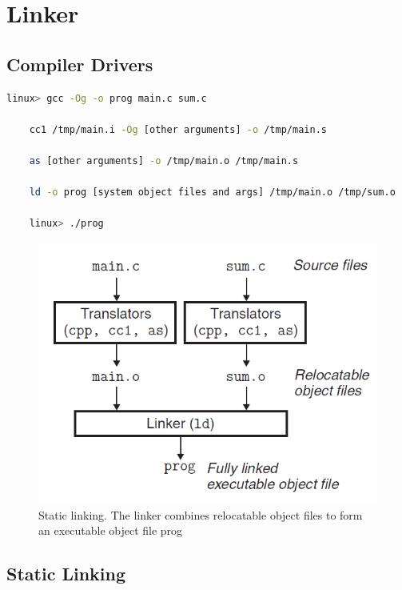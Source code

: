 \chapter{Linker}

\section{Compiler Drivers}



\begin{lstlisting}[language=bash]
    linux> gcc -Og -o prog main.c sum.c

    cc1 /tmp/main.i -Og [other arguments] -o /tmp/main.s

    as [other arguments] -o /tmp/main.o /tmp/main.s

    ld -o prog [system object files and args] /tmp/main.o /tmp/sum.o

    linux> ./prog
\end{lstlisting}

\begin{figure}[h!]
    \centering
    \includegraphics[scale=0.5]{pic/section7/pic1.png}
    \caption{Static linking. The linker combines relocatable    object files to form an executable object file prog}
\end{figure}



\section{Static Linking}

